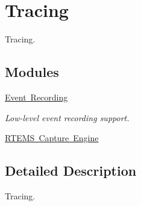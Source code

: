 \hypertarget{group__RTEMSAPITracing}{}\section{Tracing}
\label{group__RTEMSAPITracing}


Tracing.  


\subsection*{Modules}
\begin{DoxyCompactItemize}
\item 
\mbox{\hyperlink{group__RTEMSRecord}{Event Recording}}
\begin{DoxyCompactList}\small\item\em Low-\/level event recording support. \end{DoxyCompactList}\item 
\mbox{\hyperlink{group__libmisc__capture}{R\+T\+E\+M\+S Capture Engine}}
\end{DoxyCompactItemize}


\subsection{Detailed Description}
Tracing. 

